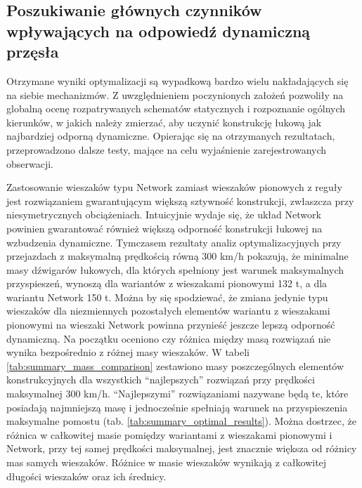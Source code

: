 \subsection{Poszukiwanie głównych czynników wpływających na odpowiedź dynamiczną przęsła}
Otrzymane wyniki optymalizacji są wypadkową bardzo wielu nakładających się na siebie mechanizmów. Z uwzględnieniem poczynionych założeń pozwoliły na globalną ocenę rozpatrywanych schematów statycznych i rozpoznanie ogólnych kierunków, w jakich należy zmierzać, aby uczynić konstrukcję łukową jak najbardziej odporną dynamiczne. Opierając się na otrzymanych rezultatach, przeprowadzono dalsze testy, mające na celu wyjaśnienie zarejestrowanych obserwacji.

Zastosowanie wieszaków typu Network zamiast wieszaków pionowych z reguły jest rozwiązaniem gwarantującym większą sztywność konstrukcji, zwłaszcza przy niesymetrycznych obciążeniach. Intuicyjnie wydaje się, że układ Network powinien gwarantować również większą odporność konstrukcji łukowej na wzbudzenia dynamiczne. Tymczasem rezultaty analiz optymalizacyjnych przy przejazdach z maksymalną prędkością równą 300 km/h pokazują, że minimalne masy dźwigarów łukowych, dla których spełniony jest warunek maksymalnych przyspieszeń, wynoszą dla wariantów z wieszakami pionowymi 132 t, a dla wariantu Network 150 t. Można by się spodziewać, że zmiana jedynie typu wieszaków dla niezmiennych pozostałych elementów wariantu z wieszakami pionowymi na wieszaki Network powinna przynieść jeszcze lepszą odporność dynamiczną. Na początku oceniono czy różnica między masą rozwiązań nie wynika bezpośrednio z różnej masy wieszaków.  W tabeli \ref{tab:summary_mass_comparison} zestawiono masy poszczególnych elementów konstrukcyjnych dla wszystkich \enquote{najlepszych} rozwiązań przy prędkości maksymalnej 300 km/h. \enquote{Najlepszymi} rozwiązaniami nazywane będą te, które posiadają najmniejszą masę i jednocześnie spełniają warunek na przyspieszenia maksymalne pomostu (tab. \ref{tab:summary_optimal_results}). Można dostrzec, że różnica w całkowitej masie pomiędzy wariantami z wieszakami pionowymi i Network, przy tej samej prędkości maksymalnej, jest znacznie większa od różnicy mas samych wieszaków. Różnice w masie wieszaków wynikają z całkowitej długości wieszaków oraz ich średnicy.


